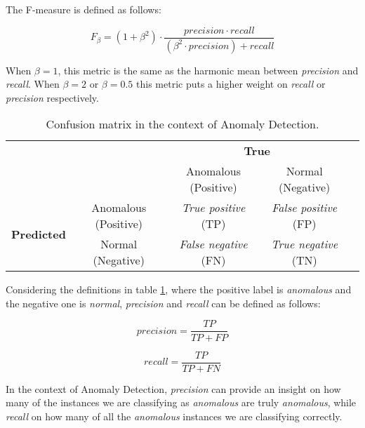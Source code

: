 The F-measure is defined as follows:

\begin{equation}\label{eq:fmeasure}
F_\beta = (1 + \beta^2) \cdot \frac{precision \cdot recall}{(\beta^2 \cdot precision) + recall}
\end{equation}

When $\beta = 1$, this metric is the same as the harmonic mean between \textit{precision} and \textit{recall}.
When $\beta = 2$ or $\beta = 0.5$ this metric puts a higher weight on \textit{recall} or \textit{precision} respectively.

\begin{table}[!ht]
	\centering
	\caption{Confusion matrix in the context of Anomaly Detection.}
	\label{tab:confusionmatrix}
	{\renewcommand{\arraystretch}{1.3}
		\begin{tabular}{cc|c|c|c}
			\cline{3-4}
			&  & \multicolumn{2}{c|}{\textbf{True}} &  \\ \cline{3-4}
			&  & Anomalous (Positive) & Normal (Negative) &  \\ \cline{1-4}
			\multicolumn{1}{|c|}{\multirow{2}{*}{\textbf{Predicted}}} & Anomalous (Positive) & \textit{True positive} (TP) & \textit{False positive} (FP) &  \\ \cline{2-4}
			\multicolumn{1}{|c|}{} & Normal (Negative) & \textit{False negative} (FN) & \textit{True negative} (TN) &  \\ \cline{1-4}
	\end{tabular} }
\end{table}

Considering the definitions in table \ref{tab:confusionmatrix}, where the positive label is \textit{anomalous} and the negative one is \textit{normal}, \textit{precision} and \textit{recall} can be defined as follows:

\begin{equation}\label{eq:precision}
precision = \frac{TP}{TP + FP}
\end{equation}

\begin{equation}\label{eq:recall}
recall = \frac{TP}{TP + FN}
\end{equation}

In the context of Anomaly Detection, \textit{precision} can provide an insight on how many of the instances we are classifying as \textit{anomalous} are truly \textit{anomalous}, while \textit{recall} on how many of all the \textit{anomalous} instances we are classifying correctly.

